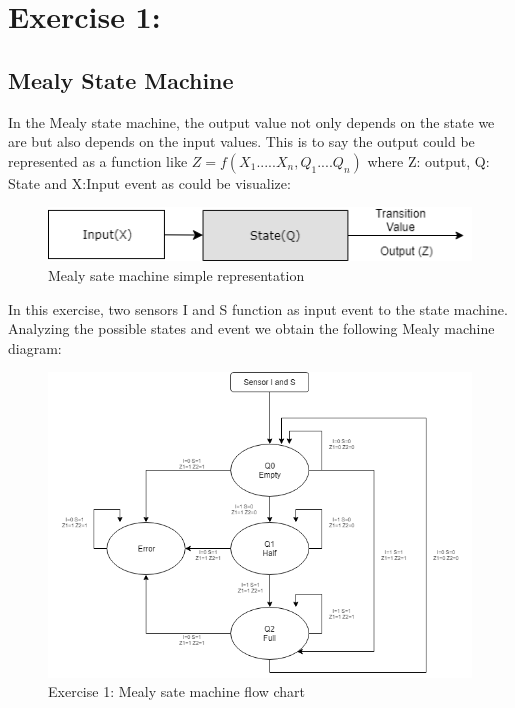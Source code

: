 %

%

%
%
%

\section{\color{olive}Exercise 1: }

\subsection{\color{purple}Mealy State Machine}

In the Mealy state machine, the output value not only depends on the state we are but also depends on the input values. This is to say the output could be represented as a function like $Z=f(X_1.....X_n,Q_1....Q_n)$ where Z: output, Q: State and X:Input event as could be visualize:

 \begin{figure}[h!]
        \centering
        \includegraphics[scale=0.75]{Mealydiagram.png}
        \caption{\color{cyan}Mealy sate machine simple representation}
        \label{fig:ej1mealyr}
    \end{figure}

In this exercise, two sensors I and S function as input event to the state machine. Analyzing the possible states and event we obtain the following Mealy machine diagram:

 \begin{figure}[h!]
        \centering
        \includegraphics[scale=0.65]{ej1mealy.png}
        \caption{\color{cyan}Exercise 1: Mealy sate machine flow chart}
        \label{fig:ej1mealyd}
    \end{figure}

